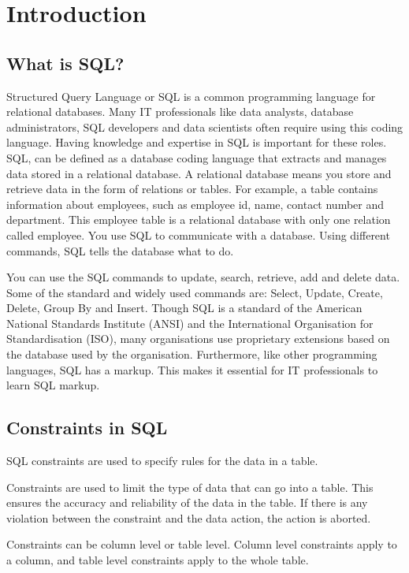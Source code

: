 \chapter{Introduction}

\section{What is SQL?}
Structured Query Language or SQL is a common programming language for relational databases. Many IT professionals like data analysts, database administrators, SQL developers and data scientists often require using this coding language. Having knowledge and expertise in SQL is important for these roles.  SQL, can be defined as a database coding language that extracts and manages data stored in a relational database. A relational database means you store and retrieve data in the form of relations or tables. For example, a table contains information about employees, such as employee id, name, contact number and department. This employee table is a relational database with only one relation called employee. You use SQL to communicate with a database. Using different commands, SQL tells the database what to do.

You can use the SQL commands to update, search, retrieve, add and delete data. Some of the standard and widely used commands are: Select, Update, Create, Delete, Group By and Insert. Though SQL is a standard of the American National Standards Institute (ANSI) and the International Organisation for Standardisation (ISO), many organisations use proprietary extensions based on the database used by the organisation. Furthermore, like other programming languages, SQL has a markup. This makes it essential for IT professionals to learn SQL markup.

\section{Constraints in SQL}
SQL constraints are used to specify rules for the data in a table.

Constraints are used to limit the type of data that can go into a table. This ensures the accuracy and reliability of the data in the table. If there is any violation between the constraint and the data action, the action is aborted.

Constraints can be column level or table level. Column level constraints apply to a column, and table level constraints apply to the whole table.

